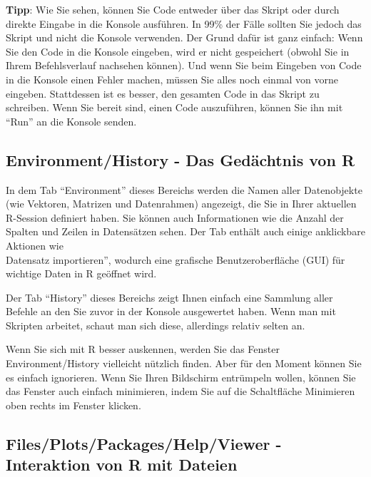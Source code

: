 \documentclass[
]{book}
\begin{document}
\textbf{Tipp}: Wie Sie sehen, können Sie Code entweder über das Skript oder durch direkte Eingabe in die Konsole ausführen. In 99\% der Fälle sollten Sie jedoch das Skript und nicht die Konsole verwenden. Der Grund dafür ist ganz einfach: Wenn Sie den Code in die Konsole eingeben, wird er nicht gespeichert (obwohl Sie in Ihrem Befehlsverlauf nachsehen können). Und wenn Sie beim Eingeben von Code in die Konsole einen Fehler machen, müssen Sie alles noch einmal von vorne eingeben. Stattdessen ist es besser, den gesamten Code in das Skript zu schreiben. Wenn Sie bereit sind, einen Code auszuführen, können Sie ihn mit ``Run'' an die Konsole senden.

\hypertarget{environmenthistory---das-geduxe4chtnis-von-r}{%
\subsection{Environment/History - Das Gedächtnis von R}\label{environmenthistory---das-geduxe4chtnis-von-r}}

In dem Tab ``Environment'' dieses Bereichs werden die Namen aller Datenobjekte (wie Vektoren, Matrizen und Datenrahmen) angezeigt, die Sie in Ihrer aktuellen R-Session definiert haben. Sie können auch Informationen wie die Anzahl der Spalten und Zeilen in Datensätzen sehen. Der Tab enthält auch einige anklickbare Aktionen wie\\
Datensatz importieren'', wodurch eine grafische Benutzeroberfläche (GUI) für wichtige Daten in R geöffnet wird.

Der Tab ``History'' dieses Bereichs zeigt Ihnen einfach eine Sammlung aller Befehle an den Sie zuvor in der Konsole ausgewertet haben. Wenn man mit Skripten arbeitet, schaut man sich diese, allerdings relativ selten an.

Wenn Sie sich mit R besser auskennen, werden Sie das Fenster Environment/History vielleicht nützlich finden. Aber für den Moment können Sie es einfach ignorieren. Wenn Sie Ihren Bildschirm entrümpeln wollen, können Sie das Fenster auch einfach minimieren, indem Sie auf die Schaltfläche Minimieren oben rechts im Fenster klicken.

\hypertarget{filesplotspackageshelpviewer---interaktion-von-r-mit-dateien}{%
\subsection{Files/Plots/Packages/Help/Viewer - Interaktion von R mit Dateien}\label{filesplotspackageshelpviewer---interaktion-von-r-mit-dateien}}
\end{document}

